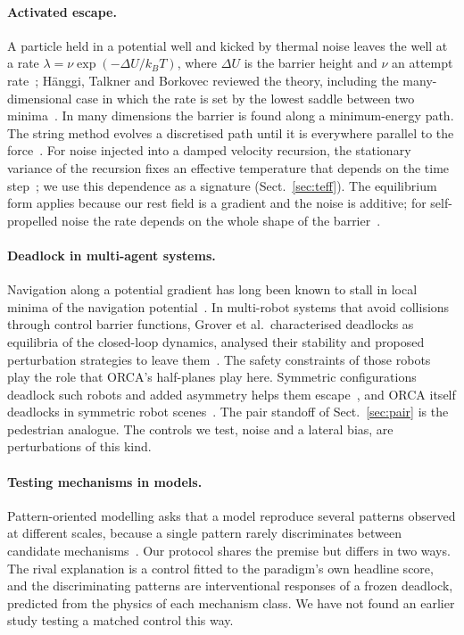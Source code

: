 \paragraph{Activated escape.}
A particle held in a potential well and kicked by thermal noise leaves the well at a rate $\lambda=\nu\exp(-\Delta U/k_BT)$, where $\Delta U$ is the barrier height and $\nu$ an attempt rate~\cite{arrhenius1889,kramers1940}; H\"anggi, Talkner and Borkovec reviewed the theory, including the many-dimensional case in which the rate is set by the lowest saddle between two minima~\cite{hanggi1990}. In many dimensions the barrier is found along a minimum-energy path. The string method evolves a discretised path until it is everywhere parallel to the force~\cite{e2002,e2007}. For noise injected into a damped velocity recursion, the stationary variance of the recursion fixes an effective temperature that depends on the time step~\cite{gronbechjensen2013}; we use this dependence as a signature (Sect.~\ref{sec:teff}). The equilibrium form applies because our rest field is a gradient and the noise is additive; for self-propelled noise the rate depends on the whole shape of the barrier~\cite{woillez2020}.

\paragraph{Deadlock in multi-agent systems.}
Navigation along a potential gradient has long been known to stall in local minima of the navigation potential~\cite{koren1991}. In multi-robot systems that avoid collisions through control barrier functions, Grover et al.\ characterised deadlocks as equilibria of the closed-loop dynamics, analysed their stability and proposed perturbation strategies to leave them~\cite{grover2020}. The safety constraints of those robots play the role that ORCA's half-planes play here. Symmetric configurations deadlock such robots and added asymmetry helps them escape~\cite{grover2020symmetry}, and ORCA itself deadlocks in symmetric robot scenes~\cite{liu2026orcadeadlock}. The pair standoff of Sect.~\ref{sec:pair} is the pedestrian analogue. The controls we test, noise and a lateral bias, are perturbations of this kind.

\paragraph{Testing mechanisms in models.}
Pattern-oriented modelling asks that a model reproduce several patterns observed at different scales, because a single pattern rarely discriminates between candidate mechanisms~\cite{grimm2005}. Our protocol shares the premise but differs in two ways. The rival explanation is a control fitted to the paradigm's own headline score, and the discriminating patterns are interventional responses of a frozen deadlock, predicted from the physics of each mechanism class. We have not found an earlier study testing a matched control this way.
